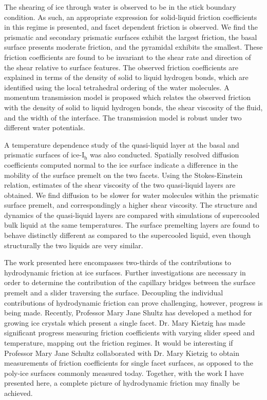 The shearing of ice through water is observed to be in the stick
boundary condition. As such, an appropriate expression for
solid-liquid friction coefficients in this regime is presented, and
facet dependent friction is observed. We find the prismatic and
secondary prismatic surfaces exhibit the largest friction, the basal
surface presents moderate friction, and the pyramidal exhibits the
smallest. These friction coefficients are found to be invariant to the
shear rate and direction of the shear relative to surface
features. The observed friction coefficients are explained in terms of
the density of solid to liquid hydrogen bonds, which are identified
using the local tetrahedral ordering of the water molecules. A
momentum transmission model is proposed which relates the observed
friction with the density of solid to liquid hydrogen bonds, the shear
viscosity of the fluid, and the width of the interface. The
transmission model is robust under two different water potentials.

A temperature dependence study of the quasi-liquid layer at the basal
and prismatic surfaces of ice-I$_\mathrm{h}$ was also
conducted. Spatially resolved diffusion coefficients computed normal
to the ice surface indicate a difference in the mobility of the
surface premelt on the two facets. Using the Stokes-Einstein relation,
estimates of the shear viscosity of the two quasi-liquid layers are
obtained. We find diffusion to be slower for water molecules within
the prismatic surface premelt, and correspondingly a higher shear
viscosity. The structure and dynamics of the quasi-liquid layers are
compared with simulations of supercooled bulk liquid at the same
temperatures. The surface premelting layers are found to behave
distinctly different as compared to the supercooled liquid, even
though structurally the two liquids are very similar.

The work presented here encompasses two-thirds of the contributions to
hydrodynamic friction at ice surfaces. Further investigations are
necessary in order to determine the contribution of the capillary
bridges between the surface premelt and a slider traversing the
surface. Decoupling the individual contributions of hydrodynamic
friction can prove challenging, however, progress is being
made. Recently, Professor Mary Jane Shultz has developed a method for
growing ice crystals which present a single facet. Dr. Mary Kietzig
has made significant progress measuring friction coefficients with
varying slider speed and temperature, mapping out the friction
regimes. It would be interesting if Professor Mary Jane Schultz
collaborated with Dr. Mary Kietzig to obtain measurements of friction
coefficients for single facet surfaces, as opposed to the poly-ice
surfaces commonly measured today. Together, with the work I have
presented here, a complete picture of hydrodynamic friction may
finally be achieved.

